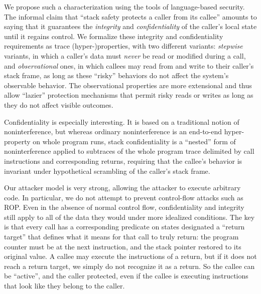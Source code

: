 \documentclass[acmtog,review,anonymous]{acmart}\settopmatter{printfolios=true,printccs=false,printacmref=false}
\begin{document}
We propose such a characterization
using the tools of language-based security. The informal claim that
``stack safety protects a caller from its callee'' amounts to saying
that it guarantees
the {\em integrity} and {\em confidentiality} of the caller's local state
until it regains control.
%
We formalize these integrity and confidentiality requirements as trace
(hyper-)properties, with two different
variants: {\em stepwise} variants, in which a caller's data must {\em never} be
read or modified during a call, and {\em observational} ones, in which
callees may read from and write to their caller's stack frame, as
long as these ``risky'' behaviors do not affect the system's observable
behavior. The observational properties are more extensional and thus
allow ``lazier'' protection mechanisms that permit risky reads or
writes as long as they do not affect visible outcomes.

Confidentiality is especially interesting.  It is based on a traditional
notion of noninterference, but whereas ordinary noninterference is
an end-to-end hyper-property on whole program runs, stack confidentiality is
a ``nested'' form of
noninterference applied to
subtraces of the whole program trace delimited by call instructions and
corresponding returns, requiring that the callee's behavior is invariant
under hypothetical scrambling of the caller's stack frame.

Our attacker model is very strong, allowing the attacker to execute arbitrary code.
In particular, we do not attempt to prevent control-flow attacks
such as ROP. Even in the absence of normal control flow, confidentiality and integrity
still apply to all of the data they would under more idealized conditions.
The key is that every call has a corresponding predicate on states
designated a ``return target''
that defines what it means for that call to truly return: the program counter
must be at the next instruction, and the stack pointer restored to its original
value. A callee may execute the instructions of a return,
but if it does not reach a return target, we simply do not recognize it as a return.
So the callee can be ``active'', and the caller protected, even if the callee is
executing instructions that look like they belong to the caller.
\end{document}

